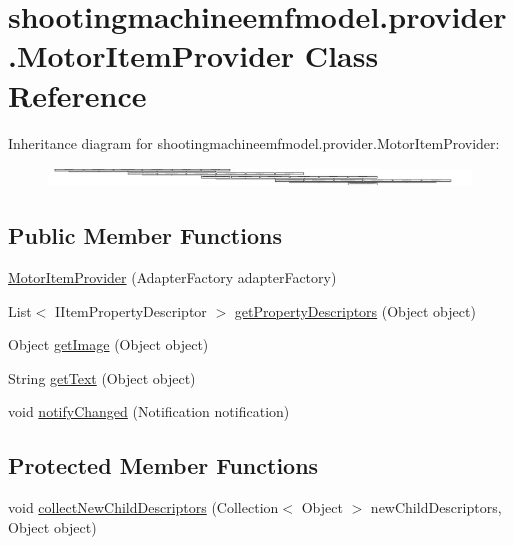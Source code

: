 \hypertarget{classshootingmachineemfmodel_1_1provider_1_1_motor_item_provider}{\section{shootingmachineemfmodel.\-provider.\-Motor\-Item\-Provider Class Reference}
\label{classshootingmachineemfmodel_1_1provider_1_1_motor_item_provider}
}
Inheritance diagram for shootingmachineemfmodel.\-provider.\-Motor\-Item\-Provider\-:\begin{figure}[H]
\begin{center}
\leavevmode
\includegraphics[height=0.534759cm]{classshootingmachineemfmodel_1_1provider_1_1_motor_item_provider}
\end{center}
\end{figure}
\subsection*{Public Member Functions}
\begin{DoxyCompactItemize}
\item 
\hyperlink{classshootingmachineemfmodel_1_1provider_1_1_motor_item_provider_aaea8f111d0945cbbc051de535fdcefa2}{Motor\-Item\-Provider} (Adapter\-Factory adapter\-Factory)
\item 
List$<$ I\-Item\-Property\-Descriptor $>$ \hyperlink{classshootingmachineemfmodel_1_1provider_1_1_motor_item_provider_a68ac07e4242890dbb1887cfa53b294f0}{get\-Property\-Descriptors} (Object object)
\item 
Object \hyperlink{classshootingmachineemfmodel_1_1provider_1_1_motor_item_provider_ab76c8228b68dc484a6d93ab7d1bb610d}{get\-Image} (Object object)
\item 
String \hyperlink{classshootingmachineemfmodel_1_1provider_1_1_motor_item_provider_a4cd8eee33ff6a8385834d20e7858b331}{get\-Text} (Object object)
\item 
void \hyperlink{classshootingmachineemfmodel_1_1provider_1_1_motor_item_provider_ab2c277d760b654dc6f152f28972552b7}{notify\-Changed} (Notification notification)
\end{DoxyCompactItemize}
\subsection*{Protected Member Functions}
\begin{DoxyCompactItemize}
\item 
void \hyperlink{classshootingmachineemfmodel_1_1provider_1_1_motor_item_provider_a148fa45ca2eb19e9c5d9c7bbb5f35234}{collect\-New\-Child\-Descriptors} (Collection$<$ Object $>$ new\-Child\-Descriptors, Object object)
\end{DoxyCompactItemize}


